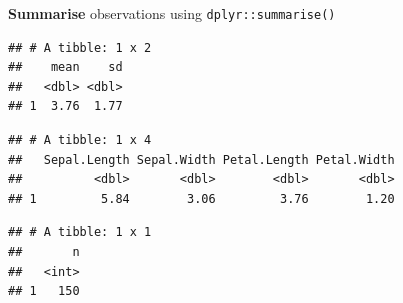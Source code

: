 \documentclass[14pt,ignorenonframetext,]{bredelebeamer}
\newenvironment{Shaded}{\begin{snugshade}}{\end{snugshade}}
\newcommand{\KeywordTok}[1]{\textcolor[rgb]{0.94,0.87,0.69}{#1}}
\newcommand{\DataTypeTok}[1]{\textcolor[rgb]{0.87,0.87,0.75}{#1}}
\newcommand{\StringTok}[1]{\textcolor[rgb]{0.80,0.58,0.58}{#1}}
\newcommand{\OperatorTok}[1]{\textcolor[rgb]{0.94,0.94,0.82}{#1}}
\newcommand{\NormalTok}[1]{\textcolor[rgb]{0.80,0.80,0.80}{#1}}
\begin{document}
\begin{frame}[fragile]{\textbf{Summarise} observations using
\texttt{dplyr::summarise()}}

\begin{Shaded}
\end{Shaded}

\begin{verbatim}
## # A tibble: 1 x 2
##    mean    sd
##   <dbl> <dbl>
## 1  3.76  1.77
\end{verbatim}

\begin{Shaded}
\end{Shaded}

\begin{verbatim}
## # A tibble: 1 x 4
##   Sepal.Length Sepal.Width Petal.Length Petal.Width
##          <dbl>       <dbl>        <dbl>       <dbl>
## 1         5.84        3.06         3.76        1.20
\end{verbatim}

\begin{Shaded}
\end{Shaded}

\begin{verbatim}
## # A tibble: 1 x 1
##       n
##   <int>
## 1   150
\end{verbatim}

\end{frame}
\end{document}
